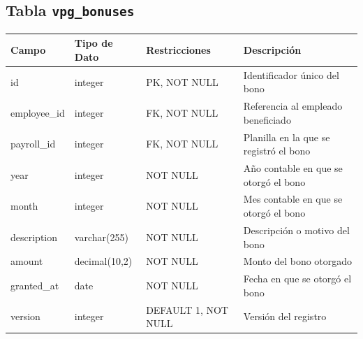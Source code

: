 \begin{center}
	\subsection{Tabla \texttt{vpg\_bonuses}}
	\small
	\begin{tabular}{|l|l|l|p{6cm}|}
		\hline
		\textbf{Campo} & \textbf{Tipo de Dato} & \textbf{Restricciones} & \textbf{Descripción}                   \\
		\hline
		id             & integer               & PK, NOT NULL           & Identificador único del bono           \\
		employee\_id   & integer               & FK, NOT NULL           & Referencia al empleado beneficiado     \\
		payroll\_id    & integer               & FK, NOT NULL           & Planilla en la que se registró el bono \\
		year           & integer               & NOT NULL               & Año contable en que se otorgó el bono  \\
		month          & integer               & NOT NULL               & Mes contable en que se otorgó el bono  \\
		description    & varchar(255)          & NOT NULL               & Descripción o motivo del bono          \\
		amount         & decimal(10,2)         & NOT NULL               & Monto del bono otorgado                \\
		granted\_at    & date                  & NOT NULL               & Fecha en que se otorgó el bono         \\
		version        & integer               & DEFAULT 1, NOT NULL    & Versión del registro                   \\
		\hline
	\end{tabular}
	\normalsize

\end{center}
